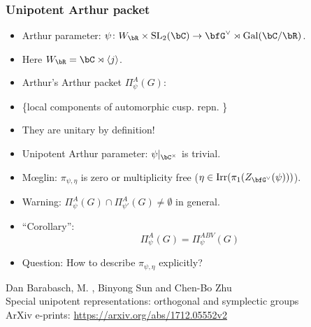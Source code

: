 \documentclass[t,mathserif,11pt,usenames,dvipsnames]{beamer}
\theoremstyle{plain}
\theoremstyle{definition}
\def\Gal{\mathrm{Gal}}
\def\SL{{\mathrm{SL}}}
\def\Irr{{\mathrm{Irr}}}
\def\red{\color{red}}
\def\lblue{\color{blue}}
\begin{document}
    \begin{frame}[label=DU]
        \frametitle{Unipotent Arthur packet}
        
        \begin{itemize}[<+->]
            \item {\lblue Arthur parameter:}
            $\psi\colon W_\bR\times \SL_2(\bC)\rightarrow \bfG^\vee \rtimes \Gal(\bC/\bR)$.
            
            \item[]\hspace{4em} Here $W_\bR = \bC\rtimes \langle j\rangle $.
            \item Arthur's Arthur packet $\Pi_{\psi}^{A}(G)$:
            \item[] \hspace{2em} \{local components of automorphic
            cusp. repn. \}
            \item[] {\red They are unitary by definition!}
            \item {\lblue Unipotent Arthur parameter}: $\psi|_{\bC^\times}$ is trivial.
            \item[]  M\oe glin: $\pi_{\psi, \eta}$ is zero or multiplicity free ($\eta\in\Irr(\pi_1(Z_{\bfG^\vee}(\psi)))$). 
            \item[] {\lblue Warning:} {\red  $\Pi_{\psi}^A(G) \cap
            \Pi^A_{\psi'}(G)\neq \emptyset$ } in general.
            \item {\lblue ``Corollary'':}
            \[
            \Pi_{\psi}^{A}(G) = \Pi_{\psi}^{ABV}(G) 
            \]
            \item {\lblue Question:} How to  describe $\pi_{\psi,\eta}$ explicitly?  
        \end{itemize}
    \end{frame}
    
    
    
    \begin{frame}
        \vfill
        Dan Barabasch, M. ,  Binyong Sun and Chen-Bo Zhu\\
        Special unipotent representations: orthogonal and symplectic groups\\
         ArXiv e-prints: \href{https://arxiv.org/abs/1712.05552v2}{https://arxiv.org/abs/1712.05552v2}
       \vfill 
        \vfill
    \end{frame}
    
    
\end{document}

